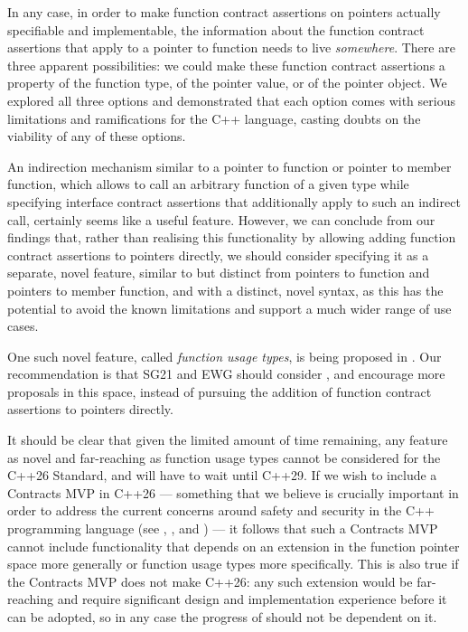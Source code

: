 In any case, in order to make function contract assertions on pointers actually specifiable and implementable, the information about the function contract assertions that apply to a pointer to function needs to live \emph{somewhere}. There are three apparent possibilities: we could make these function contract assertions a property of the function type, of the pointer value, or of the pointer object. We explored all three options and demonstrated that each option comes with serious limitations and ramifications for the C++ language, casting doubts on the viability of any of these options.

An indirection mechanism similar to a pointer to function or pointer to member function, which allows to call an arbitrary function of a given type while specifying interface contract assertions that additionally apply to such an indirect call, certainly seems like a useful feature. However, we can conclude from our findings that, rather than realising this functionality by allowing adding function contract assertions to pointers directly, we should consider specifying it as a separate, novel feature, similar to but distinct from pointers to function and pointers to member function, and with a distinct, novel syntax, as this has the potential to avoid the known limitations and support a much wider range of use cases.

One such novel feature, called \emph{function usage types}, is being proposed in \cite{P3271R0}. Our recommendation is that SG21 and EWG should consider \cite{P3271R0}, and encourage more proposals in this space, instead of pursuing the addition of function contract assertions to pointers directly.

It should be clear that given the limited amount of time remaining, any feature as novel and far-reaching as function usage types cannot be considered for the C++26 Standard, and will have to wait until C++29. If we wish to include a Contracts MVP in C++26 --- something that we believe is crucially important in order to address the current concerns around safety and security in the C++ programming language (see \cite{P3269R0}, \cite{P3276R0}, and \cite{P3297R0}) --- it follows that such a Contracts MVP cannot include functionality that depends on an extension in the function pointer space more generally or function usage types more specifically. This is also true if the Contracts MVP does not make C++26: any such extension would be far-reaching and require significant design and implementation experience before it can be adopted, so in any case the progress of \cite{P2900R7} should not be dependent on it. 

